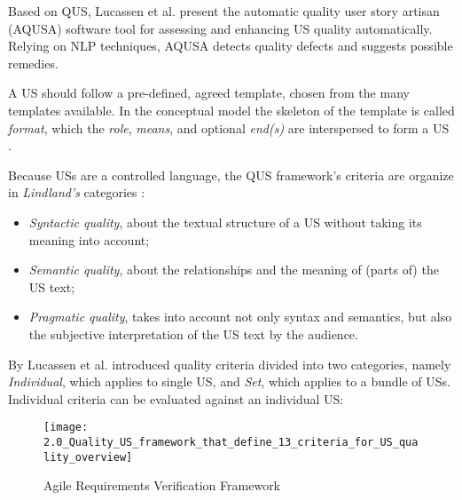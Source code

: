 Based on QUS, Lucassen et al. present the automatic quality user story artisan (AQUSA) software tool for assessing and enhancing US quality automatically. Relying on NLP techniques, AQUSA detects quality defects and suggests possible remedies.

A US should follow a pre-defined, agreed template, chosen from the many templates available. In the conceptual model the skeleton of the template is called \emph{format}, which the \emph{role}, \emph{means}, and optional \emph{end(s)} are interspersed to form a US \cite{wautelet2014unifying}. 

Because USs are a controlled language, the QUS framework’s criteria are organize in \emph{Lindland’s} categories \cite{lindland1994understanding}:

\begin{itemize}
\item\emph{ Syntactic quality}, about the textual structure of a US without taking its meaning into account;
\item\emph{Semantic quality}, about the relationships and the meaning of (parts of) the US text;
\item\emph{Pragmatic quality}, takes into account not only syntax and semantics, but also the subjective interpretation of the US text by the audience.
\end{itemize}

By Lucassen et al. introduced quality criteria divided into two categories, namely \emph{Individual}, which applies to single US, and \emph{Set}, which applies to a bundle of USs. Individual criteria can be evaluated against an individual US:


\begin{figure}[h]
\centering
\texttt{[image: 2.0\_Quality\_US\_framework\_that\_define\_13\_criteria\_for\_US\_quality\_overview]}
\caption{Agile Requirements Verification Framework \cite{lucassen2016improving}}\label{fig:qus_framework}
\end{figure}

